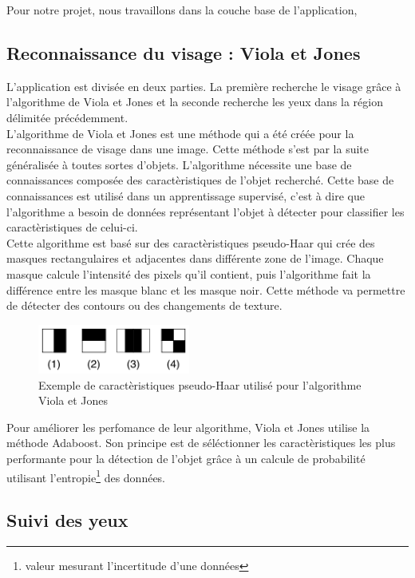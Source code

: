 Pour notre projet, nous travaillons dans la couche base de l'application,  

\subsection{Reconnaissance du visage : Viola et Jones}
L'application est divisée en deux parties. La première recherche le visage grâce à
l'algorithme de Viola et Jones et la seconde recherche les yeux dans la région délimitée
précédemment.\\

L'algorithme de Viola et Jones\cite{Viola04robustreal-time} est une méthode qui a été créée pour la reconnaissance de visage dans une 
image. Cette méthode s'est par la suite généralisée à toutes sortes d'objets. L'algorithme nécessite une 
base de connaissances composée des caractèristiques de l'objet recherché. Cette base de connaissances est utilisé dans un 
apprentissage supervisé, c'est à dire que l'algorithme a besoin de données représentant
l'objet à détecter pour classifier les caractèristiques de celui-ci.\\

Cette algorithme est basé sur des caractèristiques pseudo-Haar qui crée des masques rectangulaires et adjacentes
dans différente zone de l'image. Chaque masque calcule l'intensité des pixels qu'il contient, puis l'algorithme fait
la différence entre les masque blanc et les masque noir. Cette méthode va permettre de détecter des contours ou des changements de 
texture.\\

\begin{figure}[H]
\center
\includegraphics[width=5cm]{image/pseudo_haar.png}
\caption{Exemple de caractèristiques pseudo-Haar utilisé pour l'algorithme Viola et Jones}
\end{figure}

Pour améliorer les perfomance de leur algorithme, Viola et Jones utilise la méthode Adaboost. Son
principe est de séléctionner les caractèristiques les plus performante pour la détection de l'objet grâce à
un calcule de probabilité utilisant l'entropie\footnote{valeur mesurant l'incertitude d'une données} des données.

\subsection{Suivi des yeux}

